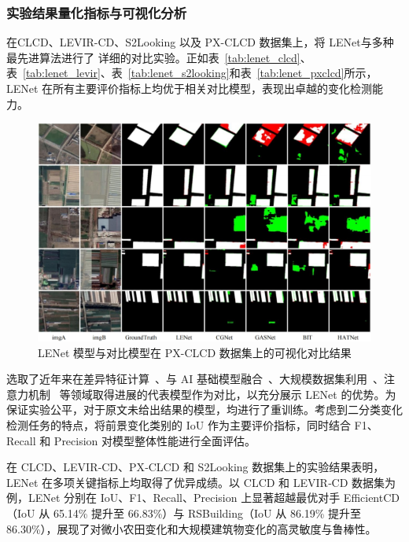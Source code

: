 \subsubsection{实验结果量化指标与可视化分析}
在CLCD、LEVIR-CD、S2Looking 以及 PX-CLCD 数据集上，将 LENet与多种最先进算法进行了 详细的对比实验。正如表~\ref{tab:lenet_clcd}、表~\ref{tab:lenet_levir}、表~\ref{tab:lenet_s2looking}和表~\ref{tab:lenet_pxclcd}所示，LENet 在所有主要评价指标上均优于相关对比模型，表现出卓越的变化检测能力。

\begin{figure}[!htbp]
  \centering
  \includegraphics[width=\textwidth]{paper_figures/基于双时相遥感影像特征交互的变化检测算法研究/LENet/lenet_pxclcd.png}
  \caption{LENet 模型与对比模型在 PX-CLCD 数据集上的可视化对比结果}
  \label{fig:lenet_pxclcd}
\end{figure}

选取了近年来在差异特征计算~\cite{feng_change_2023}、与 AI 基础模型融合~\cite{Sun2024SegmentAM, Qiu2025DEDSAMAdaptingSA}、大规模数据集利用~\cite{wang_rsbuilding_2024}、注意力机制~\cite{Song2023AxialCA, chen_remote_2022} 等领域取得进展的代表模型作为对比，以充分展示 LENet 的优势。为保证实验公平，对于原文未给出结果的模型，均进行了重训练。考虑到二分类变化检测任务的特点，将前景变化类别的 IoU 作为主要评价指标，同时结合 F1、Recall 和 Precision 对模型整体性能进行全面评估。

在 CLCD、LEVIR‐CD、PX‐CLCD 和 S2Looking 数据集上的实验结果表明，LENet 在多项关键指标上均取得了优异成绩。以 CLCD 和 LEVIR‐CD 数据集为例，LENet 分别在 IoU、F1、Recall、Precision 上显著超越最优对手 EfficientCD（IoU 从 65.14\% 提升至 66.83\%）与 RSBuilding（IoU 从 86.19\% 提升至 86.30\%），展现了对微小农田变化和大规模建筑物变化的高灵敏度与鲁棒性。

